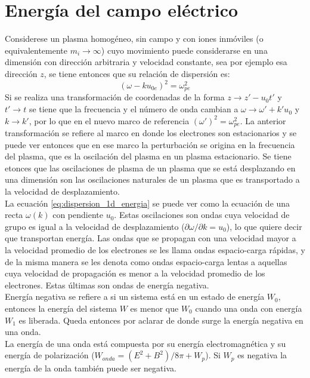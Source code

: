 \documentclass[../tesis_main_file.tex]{subfiles}
\begin{document}
\section{Energía del campo eléctrico}
Considerese un plasma homogéneo, sin campo y con iones inmóviles (o equivalentemente $m_i \rightarrow \infty$) cuyo movimiento puede considerarse en una dimensión con dirección arbitraria y velocidad constante, sea por ejemplo esa dirección $z$, se tiene entonces que su relación de dispersión es:
\begin{equation}
\label{eq:dispersion_1d_energia}
(\omega - ku_{0e})^2 = \omega_{pe}^2
\end{equation}
Si se realiza una transformación de coordenadas de la forma $z \rightarrow z'-u_0t'$ y $t' \rightarrow t$ se tiene que la frecuencia y el número de onda cambian a $\omega \rightarrow \omega' + k'u_0$ y $k \rightarrow k'$, por lo que en el nuevo marco de referencia $(\omega')^2=\omega_{pe}^2$. La anterior transformación se refiere al marco en donde los electrones son estacionarios y se puede ver entonces que en ese marco la perturbación se origina en la frecuencia del plasma, que es la oscilación del plasma en un plasma estacionario. Se tiene etonces que las oscilaciones de plasma de un plasma que se está desplazando en una dimensión son las oscilaciones naturales de un plasma que es transportado a la velocidad de desplazamiento. \cite{krall1973principles}\\
La ecuación \ref{eq:dispersion_1d_energia} se puede ver como la ecuación de una recta $\omega(k)$ con pendiente $u_0$. Estas oscilaciones son ondas cuya velocidad de grupo es igual a la velocidad de desplazamiento ($\partial \omega /\partial k=u_0$), lo que quiere decir que transportan energía. Las ondas que se propagan con una velocidad mayor a la velocidad promedio de los electrones se les llama ondas espacio-carga rápidas, y de la misma manera se les denota como ondas espacio-carga lentas a aquellas cuya velocidad de propagación es menor a la velocidad promedio de los electrones. Estas últimas son ondas de energía negativa.\\
Energía negativa se refiere a si un sistema está en un estado de energía $W_0$, entonces la energía del sistema $W$ es menor que $W_0$ cuando una onda con energía $W_1$ es liberada. Queda entonces por aclarar de donde surge la energía negativa en una onda.\\
La energía de una onda está compuesta por su energía electromagnética y su energía de polarización ($W_{onda}=(E^2 +B^2)/8\pi + W_p$). Si $W_p$ es negativa la energía de la onda también puede ser negativa.\\
\end{document}
